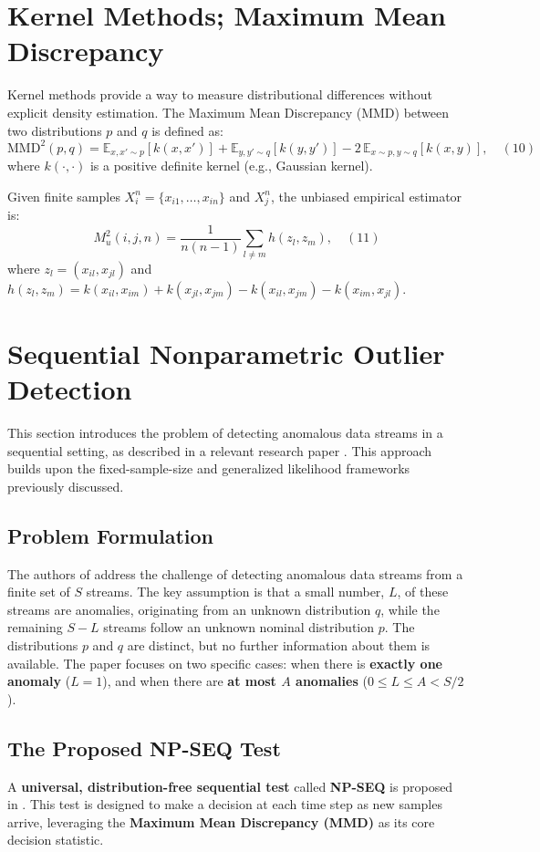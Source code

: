 \section{Kernel Methods; Maximum Mean Discrepancy}
Kernel methods provide a way to measure distributional differences without explicit density estimation. The Maximum Mean Discrepancy (MMD) between two distributions $p$ and $q$ is defined as:
\[
\text{MMD}^2(p,q) = \mathbb{E}_{x,x' \sim p}[k(x,x')] + \mathbb{E}_{y,y' \sim q}[k(y,y')] - 2 \, \mathbb{E}_{x \sim p, y \sim q}[k(x,y)], \quad (10)
\]
where $k(\cdot,\cdot)$ is a positive definite kernel (e.g., Gaussian kernel).

Given finite samples $X_i^n = \{x_{i1}, \dots, x_{in}\}$ and $X_j^n$, the unbiased empirical estimator is:
\[
M_u^2(i,j,n) = \frac{1}{n(n-1)} \sum_{l \neq m} h(z_l,z_m), \quad (11)
\]
where $z_l = (x_{il},x_{jl})$ and $h(z_l,z_m) = k(x_{il},x_{im}) + k(x_{jl},x_{jm}) - k(x_{il},x_{jm}) - k(x_{im},x_{jl})$.

\section{Sequential Nonparametric Outlier Detection}
This section introduces the problem of detecting anomalous data streams in a sequential setting, as described in a relevant research paper \cite{sreenivasan2021sequential}. This approach builds upon the fixed-sample-size and generalized likelihood frameworks previously discussed.

\subsection{Problem Formulation}
The authors of \cite{sreenivasan2021sequential} address the challenge of detecting anomalous data streams from a finite set of $S$ streams. The key assumption is that a small number, $L$, of these streams are anomalies, originating from an unknown distribution $q$, while the remaining $S-L$ streams follow an unknown nominal distribution $p$. The distributions $p$ and $q$ are distinct, but no further information about them is available. The paper focuses on two specific cases: when there is \textbf{exactly one anomaly} ($L=1$), and when there are \textbf{at most $A$ anomalies} ($0 \leq L \leq A < S/2$).

\subsection{The Proposed NP-SEQ Test}
A \textbf{universal, distribution-free sequential test} called \textbf{NP-SEQ} is proposed in \cite{sreenivasan2021sequential}. This test is designed to make a decision at each time step as new samples arrive, leveraging the \textbf{Maximum Mean Discrepancy (MMD)} as its core decision statistic.

